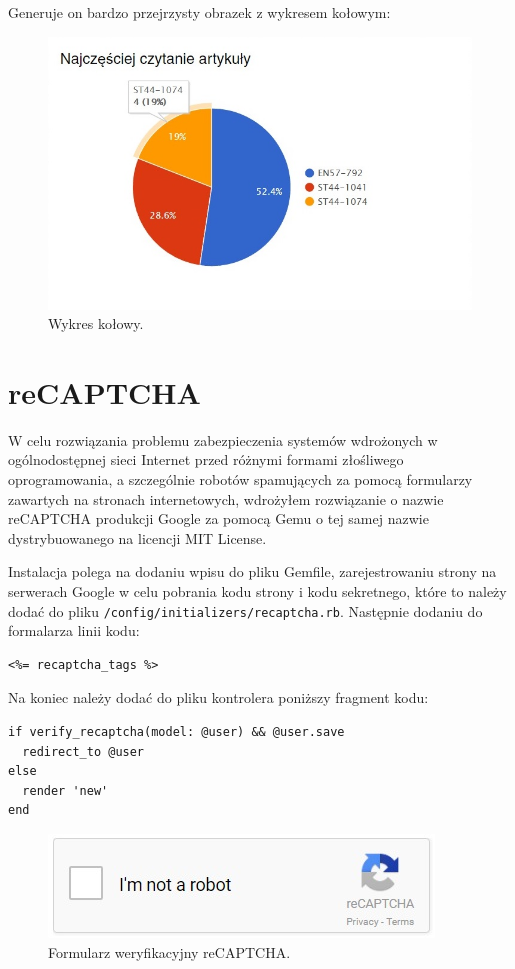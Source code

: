 \documentclass[openright]{xmgr}
\begin{document}
\newpage

Generuje on bardzo przejrzysty obrazek z wykresem kołowym:
\begin{figure}[!tbh]
\centering
\includegraphics[width=.8\linewidth]{fig/chartkick}
\caption{Wykres kołowy.}
\end{figure}

\section{reCAPTCHA}

W celu rozwiązania problemu zabezpieczenia systemów wdrożonych w ogólnodostępnej sieci Internet przed różnymi formami złośliwego oprogramowania, a szczególnie robotów spamujących za pomocą formularzy zawartych na stronach internetowych, wdrożyłem rozwiązanie o nazwie reCAPTCHA produkcji Google za pomocą Gemu o tej samej nazwie \cite{recaptcha} dystrybuowanego na licencji MIT License. 

\newpage

Instalacja polega na dodaniu wpisu do pliku Gemfile, zarejestrowaniu strony na serwerach Google w celu pobrania kodu strony i kodu sekretnego, które to należy dodać do pliku \texttt{/config/initializers/recaptcha.rb}. Następnie dodaniu do formalarza linii kodu:
\begin{lstlisting}[language=ruby2, caption={Kod wyświetlający formularz reCAPTCHA}]
<%= recaptcha_tags %> 
\end{lstlisting}
Na koniec należy dodać do pliku kontrolera poniższy fragment kodu: 
\begin{lstlisting}[language=ruby2, caption={Kod kontrolera weryfikujący reCAPTCHA}]
if verify_recaptcha(model: @user) && @user.save
  redirect_to @user
else
  render 'new'
end
\end{lstlisting}

\begin{figure}[!tbh]
\centering
\includegraphics[width=.6\linewidth]{fig/captcha}
\caption{Formularz weryfikacyjny reCAPTCHA.}
\end{figure}
\end{document}
